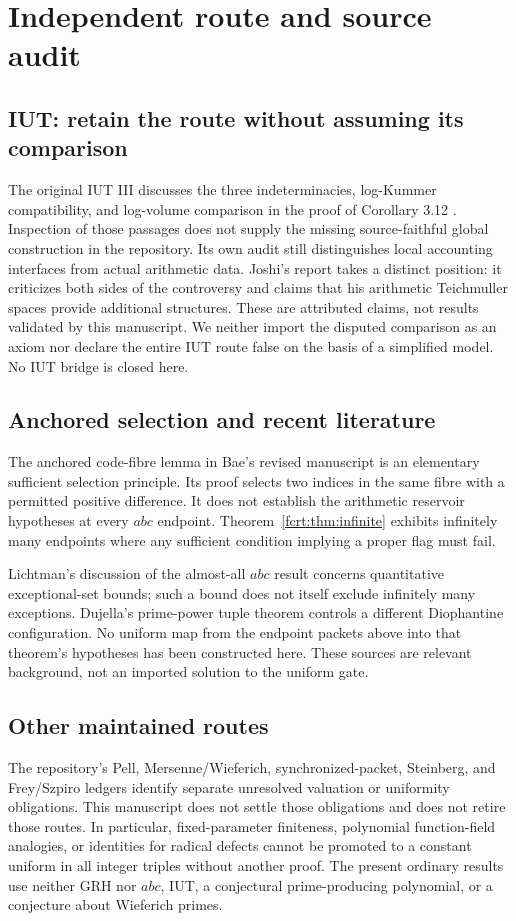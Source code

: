 \section{Independent route and source audit}
\subsection{IUT: retain the route without assuming its comparison}
The original IUT III discusses the three indeterminacies, log-Kummer
compatibility, and log-volume comparison in the proof of Corollary 3.12
\cite{fcrt:iut}. Inspection of those passages does not supply the missing
source-faithful global construction in the repository. Its own audit still
distinguishes local accounting interfaces from actual arithmetic data.
Joshi's report \cite{fcrt:joshi} takes a distinct position: it criticizes both
sides of the controversy and claims that his arithmetic Teichmuller spaces
provide additional structures. These are attributed claims, not results
validated by this manuscript. We neither import the disputed comparison as
an axiom nor declare the entire IUT route false on the basis of a simplified
model. No IUT bridge is closed here.

\subsection{Anchored selection and recent literature}
The anchored code-fibre lemma in Bae's revised manuscript
\cite{fcrt:bae} is an elementary sufficient selection principle. Its proof
selects two indices in the same fibre with a permitted positive difference.
It does not establish the arithmetic reservoir hypotheses at every \(abc\)
endpoint. Theorem~\ref{fcrt:thm:infinite} exhibits infinitely many endpoints
where any sufficient condition implying a proper flag must fail.

Lichtman's discussion of the almost-all \(abc\) result \cite{fcrt:lichtman}
concerns quantitative exceptional-set bounds; such a bound does not itself
exclude infinitely many exceptions. Dujella's prime-power tuple theorem
\cite{fcrt:dujella} controls a different Diophantine configuration. No uniform
map from the endpoint packets above into that theorem's hypotheses has been
constructed here. These sources are relevant background, not an imported
solution to the uniform gate.

\subsection{Other maintained routes}
The repository's Pell, Mersenne/Wieferich, synchronized-packet, Steinberg,
and Frey/Szpiro ledgers identify separate unresolved valuation or uniformity
obligations. This manuscript does not settle those obligations and does not
retire those routes. In particular, fixed-parameter finiteness, polynomial
function-field analogies, or identities for radical defects cannot be promoted
to a constant uniform in all integer triples without another proof. The
present ordinary results use neither GRH nor \(abc\), IUT, a conjectural
prime-producing polynomial, or a conjecture about Wieferich primes.

